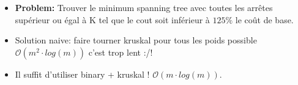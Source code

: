 \begin{frame}
    \frametitle{\problemtitle}
    \begin{itemize}
        \item<+-> \textbf{Problem:} Trouver le minimum spanning tree avec toutes les arrêtes supérieur ou égal à K tel que le cout soit inférieur à $125\%$ le coût de base.
        \item<+-> Solution naive: faire tourner kruskal pour tous les poids possible $\mathcal O(m^2\cdot log(m))$ c'est trop lent :/!
        \item<+-> Il suffit d'utiliser binary + kruskal ! $\mathcal O(m \cdot log(m))$.
    \end{itemize}
\end{frame}

